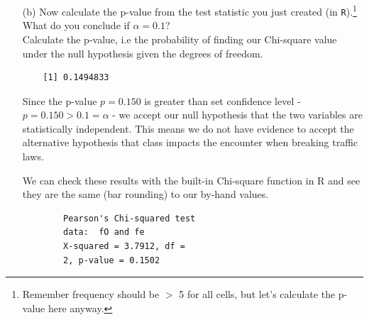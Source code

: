 \documentclass[12pt,letterpaper]{article}
\begin{document}
\begin{enumerate}
	We also determine the expected frequencies of the data, which are the frequencies expected if the categories had no impact on the other variable. 
	\begin{equation}
		f_e = \frac{row\quad total}{grand\quad total} \times column\quad  total
	\end{equation}
	
	\begin{verbatim}
		Expected Frequencies
		            Not_Stopped Bribe_Requested Stopped_Warned
		Upper Class        13.5            8.36           5.14
		Lower Class         7.5            4.64           2.86
	\end{verbatim}
	
	Now we compare the observed and expected frequency tables to calculate a Chi-square.
		\begin{equation}
		\chi^2 = \sum\frac{(f_O - f_e)^2}{f_e} 
	\end{equation}
	
	\begin{verbatim}
		[1] 3.801141
	\end{verbatim}
	
	The overall test statistic of the Chi-squared is $\chi ^2 = 3.80$
	\vspace*{1cm}
	
	\item [(b)]
	Now calculate the p-value from the test statistic you just created (in \texttt{R}).\footnote{Remember frequency should be $>$ 5 for all cells, but let's calculate the p-value here anyway.}  What do you conclude if $\alpha = 0.1$?\\
	
	Calculate the p-value, i.e the probability of finding our Chi-square value under the null hypothesis given the degrees of freedom. 
	
	\begin{verbatim}
	[1] 0.1494833
	\end{verbatim}
	
	 Since the p-value $p=0.150$ is greater than set confidence level - $p=0.150 > 0.1 = \alpha $ - we accept our null hypothesis that the two variables are statistically independent. This means we do not have evidence to accept the alternative hypothesis that class impacts the encounter when breaking traffic laws.  
	
	We can check these results with the  built-in Chi-square function in R and see they are the same (bar rounding) to our by-hand values. 
	
	 \begin{verbatim}
	 	Pearson's Chi-squared test
	 	data:  fO and fe
	 	X-squared = 3.7912, df =
	 	2, p-value = 0.1502
	 \end{verbatim}
	 

\end{enumerate}
\end{document}
